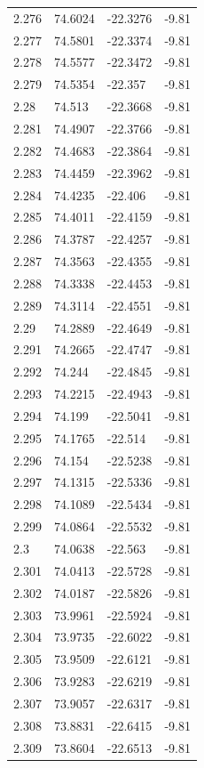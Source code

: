 \begin{tabular}{llll}
2.276 & 74.6024 & -22.3276 & -9.81 \\
2.277 & 74.5801 & -22.3374 & -9.81 \\
2.278 & 74.5577 & -22.3472 & -9.81 \\
2.279 & 74.5354 & -22.357 & -9.81 \\
2.28 & 74.513 & -22.3668 & -9.81 \\
2.281 & 74.4907 & -22.3766 & -9.81 \\
2.282 & 74.4683 & -22.3864 & -9.81 \\
2.283 & 74.4459 & -22.3962 & -9.81 \\
2.284 & 74.4235 & -22.406 & -9.81 \\
2.285 & 74.4011 & -22.4159 & -9.81 \\
2.286 & 74.3787 & -22.4257 & -9.81 \\
2.287 & 74.3563 & -22.4355 & -9.81 \\
2.288 & 74.3338 & -22.4453 & -9.81 \\
2.289 & 74.3114 & -22.4551 & -9.81 \\
2.29 & 74.2889 & -22.4649 & -9.81 \\
2.291 & 74.2665 & -22.4747 & -9.81 \\
2.292 & 74.244 & -22.4845 & -9.81 \\
2.293 & 74.2215 & -22.4943 & -9.81 \\
2.294 & 74.199 & -22.5041 & -9.81 \\
2.295 & 74.1765 & -22.514 & -9.81 \\
2.296 & 74.154 & -22.5238 & -9.81 \\
2.297 & 74.1315 & -22.5336 & -9.81 \\
2.298 & 74.1089 & -22.5434 & -9.81 \\
2.299 & 74.0864 & -22.5532 & -9.81 \\
2.3 & 74.0638 & -22.563 & -9.81 \\
2.301 & 74.0413 & -22.5728 & -9.81 \\
2.302 & 74.0187 & -22.5826 & -9.81 \\
2.303 & 73.9961 & -22.5924 & -9.81 \\
2.304 & 73.9735 & -22.6022 & -9.81 \\
2.305 & 73.9509 & -22.6121 & -9.81 \\
2.306 & 73.9283 & -22.6219 & -9.81 \\
2.307 & 73.9057 & -22.6317 & -9.81 \\
2.308 & 73.8831 & -22.6415 & -9.81 \\
2.309 & 73.8604 & -22.6513 & -9.81 \\

\end{tabular}
